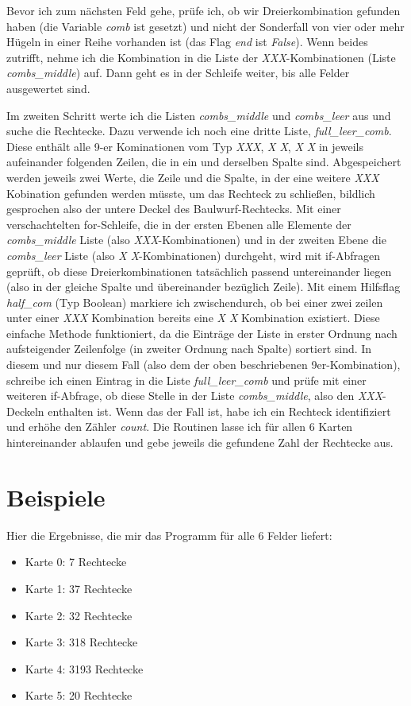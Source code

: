\documentclass[a4paper,10pt,ngerman]{scrartcl}
\begin{document}
\begin{itemize}
\begin{itemize}
\begin{itemize}
    \end{itemize}
\end{itemize}
Bevor ich zum nächsten Feld gehe, prüfe ich, ob wir Dreierkombination gefunden haben (die Variable \textit{comb} ist gesetzt) und nicht der Sonderfall von vier oder mehr Hügeln in einer Reihe vorhanden ist (das Flag \textit{end} ist \textit{False}). Wenn beides zutrifft, nehme ich die Kombination in die Liste der \textit{XXX}-Kombinationen (Liste \textit{combs\_middle}) auf. Dann geht es in der Schleife weiter, bis alle Felder ausgewertet sind.
\end{itemize}
Im zweiten Schritt werte ich die Listen \textit{combs\_middle} und \textit{combs\_leer} aus und suche die Rechtecke. Dazu verwende ich noch eine dritte Liste, \textit{full\_leer\_comb}. Diese enthält alle 9-er Kominationen vom Typ \textit{XXX}, \textit{X X}, \textit{X X} in jeweils aufeinander folgenden Zeilen, die in ein und derselben Spalte sind. Abgespeichert werden jeweils zwei Werte, die Zeile und die Spalte, in der eine weitere \textit{XXX} Kobination gefunden werden müsste, um das Rechteck zu schließen, bildlich gesprochen also der untere Deckel des Baulwurf-Rechtecks.
Mit einer verschachtelten for-Schleife, die in der ersten Ebenen alle Elemente der \textit{combs\_middle} Liste (also \textit{XXX}-Kombinationen) und in der zweiten Ebene die \textit{combs\_leer} Liste (also \textit{X X}-Kombinationen) durchgeht, wird mit if-Abfragen geprüft, ob diese Dreierkombinationen tatsächlich passend untereinander liegen (also in der gleiche Spalte und übereinander bezüglich Zeile). Mit einem Hilfsflag \textit{half\_com} (Typ Boolean) markiere ich zwischendurch, ob bei einer zwei zeilen unter einer \textit{XXX} Kombination bereits eine \textit{X X} Kombination existiert. Diese einfache Methode funktioniert, da die Einträge der Liste in erster Ordnung nach aufsteigender Zeilenfolge (in zweiter Ordnung nach Spalte) sortiert sind.
In diesem und nur diesem Fall (also dem der oben beschriebenen 9er-Kombination), schreibe ich einen Eintrag in die Liste \textit{full\_leer\_comb} und prüfe mit einer weiteren if-Abfrage, ob diese Stelle in der Liste \textit{combs\_middle}, also den \textit{XXX}-Deckeln enthalten ist. Wenn das der Fall ist, habe ich ein Rechteck identifiziert und erhöhe den Zähler \textit{count}.
Die Routinen lasse ich für allen 6 Karten hintereinander ablaufen und gebe jeweils die gefundene Zahl der Rechtecke aus.  
\section{Beispiele}
Hier die Ergebnisse, die mir das Programm für alle 6 Felder liefert:
\begin{itemize}
\item Karte 0: 7 Rechtecke
\item Karte 1: 37 Rechtecke
\item Karte 2: 32 Rechtecke
\item Karte 3: 318 Rechtecke
\item Karte 4: 3193 Rechtecke
\item Karte 5: 20 Rechtecke
\end{itemize}
\end{document}
